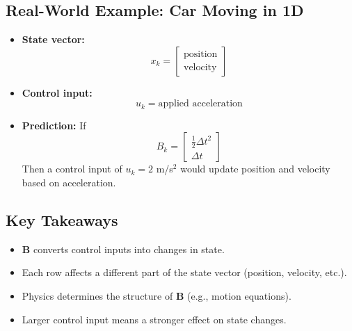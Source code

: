 \documentclass{article}
\begin{document}
\subsection*{Real-World Example: Car Moving in 1D}
\begin{itemize}
    \item \textbf{State vector:}  
    \[
    x_k =
    \begin{bmatrix}
    \text{position} \\
    \text{velocity}
    \end{bmatrix}
    \]
    \item \textbf{Control input:}  
    \[
    u_k = \text{applied acceleration}
    \]
    \item \textbf{Prediction:}  
    If 
    \[
    B_k =
    \begin{bmatrix}
    \frac{1}{2} \Delta t^2 \\
    \Delta t
    \end{bmatrix}
    \]
    Then a control input of \( u_k = 2 \) m/s\(^2\) would update position and velocity based on acceleration.
\end{itemize}

\subsection*{Key Takeaways}
\begin{itemize}
    \item {} \(\mathbf{B}\) converts control inputs into changes in state.
    \item {} Each row affects a different part of the state vector (position, velocity, etc.).
    \item {} Physics determines the structure of \(\mathbf{B}\) (e.g., motion equations).
    \item {} Larger control input means a stronger effect on state changes.
\end{itemize}

\newpage
\end{document}
